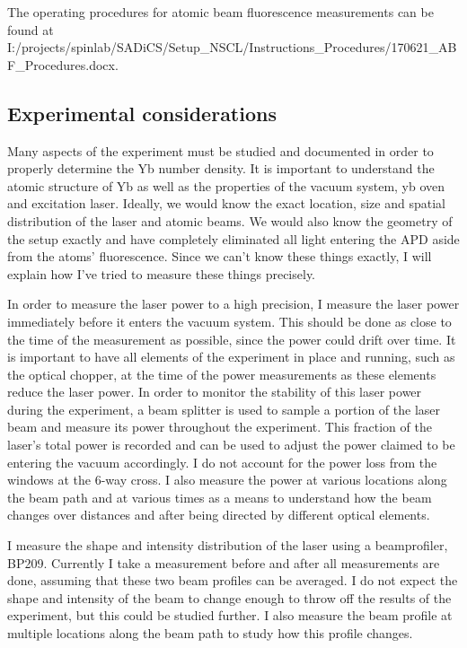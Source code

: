 \documentclass[12pt, a4paper]{article}
\begin{document}
The operating procedures for atomic beam fluorescence measurements can be found at I:/projects/spinlab/SADiCS/Setup\_NSCL/Instructions\_Procedures/170621\_ABF\_Procedures.docx.
 
\subsection{Experimental considerations}
Many aspects of the experiment must be studied and documented in order to properly determine the Yb number density. It is important to understand the atomic structure of Yb as well as the properties of the vacuum system, yb oven and excitation laser. Ideally, we would know the exact location, size and spatial distribution of the laser and atomic beams. We would also know the geometry of the setup exactly and have completely eliminated all light entering the APD aside from the atoms' fluorescence. Since we can't know these things exactly, I will explain how I've tried to measure these things precisely. 

In order to measure the laser power to a high precision, I measure the laser power immediately before it enters the vacuum system. This should be done as close to the time of the measurement as possible, since the power could drift over time. It is important to have all elements of the experiment in place and running, such as the optical chopper, at the time of the power measurements as these elements reduce the laser power. In order to monitor the stability of this laser power during the experiment, a beam splitter is used to sample a portion of the laser beam and measure its power throughout the experiment. This fraction of the laser's total power is recorded and can be used to adjust the power claimed to be entering the vacuum accordingly. I do not account for the power loss from the windows at the 6-way cross. I also measure the power at various locations along the beam path and at various times as a means to understand how the beam changes over distances and after being directed by different optical elements.

I measure the shape and intensity distribution of the laser using a beamprofiler, BP209. Currently I take a measurement before and after all measurements are done, assuming that these two beam profiles can be averaged. I do not expect the shape and intensity of the beam to change enough to throw off the results of the experiment, but this could be studied further. I also measure the beam profile at multiple locations along the beam path to study how this profile changes. 
\end{document}
